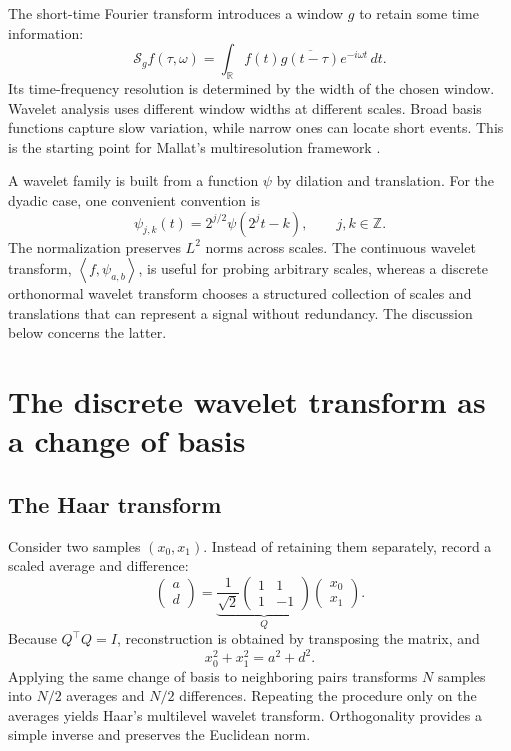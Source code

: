 \documentclass{article}
\theoremstyle{definition}
\theoremstyle{remark}
\newcommand{\R}{\mathbb R}
\newcommand{\Z}{\mathbb Z}
\newcommand{\inner}[2]{\left\langle#1,#2\right\rangle}
\begin{document}
The short-time Fourier transform introduces a window $g$ to retain some time information:
\begin{equation}
\mathcal S_gf(\tau,\omega)
=\int_{\R} f(t)\overline{g(t-\tau)}e^{-i\omega t}\,dt.
\end{equation}
Its time-frequency resolution is determined by the width of the chosen window. Wavelet analysis uses different window widths at different scales. Broad basis functions capture slow variation, while narrow ones can locate short events. This is the starting point for Mallat's multiresolution framework \cite{mallat1989}.

A wavelet family is built from a function $\psi$ by dilation and translation. For the dyadic case, one convenient convention is
\begin{equation}
\psi_{j,k}(t)=2^{j/2}\psi(2^jt-k),\qquad j,k\in\Z.
\label{eq:dyadfamily}
\end{equation}
The normalization preserves $L^2$ norms across scales. The continuous wavelet transform, $\inner{f}{\psi_{a,b}}$, is useful for probing arbitrary scales, whereas a discrete orthonormal wavelet transform chooses a structured collection of scales and translations that can represent a signal without redundancy. The discussion below concerns the latter.

\section{The discrete wavelet transform as a change of basis}
\subsection{The Haar transform}
Consider two samples $(x_0,x_1)$. Instead of retaining them separately, record a scaled average and difference:
\begin{equation}
\begin{pmatrix}a\\d\end{pmatrix}
=\underbrace{\frac{1}{\sqrt2}\begin{pmatrix}1&1\\1&-1\end{pmatrix}}_{Q}
\begin{pmatrix}x_0\\x_1\end{pmatrix}.
\label{eq:haar}
\end{equation}
Because $Q^\top Q=I$, reconstruction is obtained by transposing the matrix, and
\begin{equation}
 x_0^2+x_1^2=a^2+d^2.
\end{equation}
Applying the same change of basis to neighboring pairs transforms $N$ samples into $N/2$ averages and $N/2$ differences. Repeating the procedure only on the averages yields Haar's multilevel wavelet transform. Orthogonality provides a simple inverse and preserves the Euclidean norm.
\end{document}
